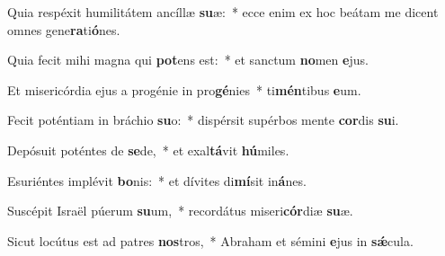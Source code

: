 \item Quia respéxit humilitátem ancíllæ \textbf{su}æ:~* ecce enim ex hoc beátam me dicent omnes gene\textbf{ra}ti\textbf{ó}nes.
\item Quia fecit mihi magna qui \textbf{pot}ens est:~* et sanctum \textbf{no}men \textbf{e}jus.
\item Et misericórdia ejus a progénie in pro\textbf{gé}nies~* ti\textbf{mén}tibus \textbf{e}um.
\item Fecit poténtiam in bráchio \textbf{su}o:~* dispérsit supérbos mente \textbf{cor}dis \textbf{su}i.
\item Depósuit poténtes de \textbf{se}de,~* et exal\textbf{tá}vit \textbf{hú}miles.
\item Esuriéntes implévit \textbf{bo}nis:~* et dívites di\textbf{mí}sit in\textbf{á}nes.
\item Suscépit Israël púerum \textbf{su}um,~* recordátus miseri\textbf{cór}diæ \textbf{su}æ.
\item Sicut locútus est ad patres \textbf{nos}tros,~* Abraham et sémini \textbf{e}jus in \textbf{sǽ}cula.
